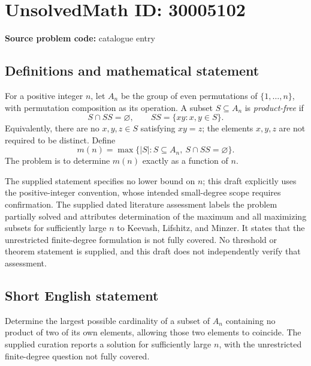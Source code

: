 \documentclass[11pt]{article}
\begin{document}
\section*{UnsolvedMath ID: 30005102}
\textbf{Source problem code:} catalogue entry
\subsection{Definitions and mathematical statement}
For a positive integer \(n\), let \(A_n\) be the group of even permutations of \(\{1,\ldots,n\}\), with permutation composition as its operation. A subset \(S\subseteq A_n\) is \emph{product-free} if
\[
S\cap SS=\varnothing,
\qquad SS=\{xy:x,y\in S\}.
\]
Equivalently, there are no \(x,y,z\in S\) satisfying \(xy=z\); the elements \(x,y,z\) are not required to be distinct. Define
\[
m(n)=\max\bigl\{|S|:S\subseteq A_n,\ S\cap SS=\varnothing\bigr\}.
\]
The problem is to determine \(m(n)\) exactly as a function of \(n\).

The supplied statement specifies no lower bound on \(n\); this draft explicitly uses the positive-integer convention, whose intended small-degree scope requires confirmation. The supplied dated literature assessment labels the problem partially solved and attributes determination of the maximum and all maximizing subsets for sufficiently large \(n\) to Keevash, Lifshitz, and Minzer. It states that the unrestricted finite-degree formulation is not fully covered. No threshold or theorem statement is supplied, and this draft does not independently verify that assessment.
\subsection{Short English statement}
Determine the largest possible cardinality of a subset of \(A_n\) containing no product of two of its own elements, allowing those two elements to coincide. The supplied curation reports a solution for sufficiently large \(n\), with the unrestricted finite-degree question not fully covered.
\end{document}
